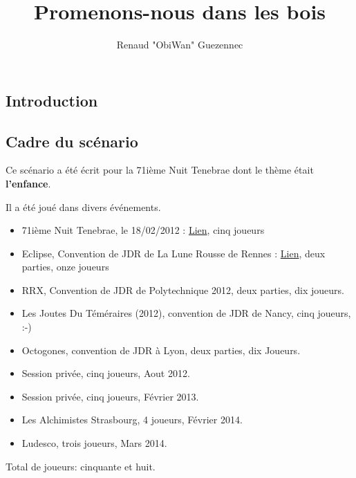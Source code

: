 \documentclass[oneside,12pt]{book}
\title{Promenons-nous dans les bois}
\author{Renaud "ObiWan" Guezennec}
\date{}
\begin{document}
\maketitle \clearpage
\tableofcontents \clearpage
\listoffigures \clearpage

\begin{flushleft}
    \chapter{Introduction}
    \section{Cadre du scénario}
    Ce scénario a été écrit pour la 71ième Nuit Tenebrae dont le thème était \textbf{l'enfance}. 
    
    Il a été joué dans divers événements. 
    \begin{itemize}
    \item 71ième Nuit Tenebrae, le 18/02/2012 : \href{http://www.tenebrae-mundis.com/les-nuits-tenebrae/teaser-de-la-71e-nuit-tenebrae}{Lien}, cinq joueurs
    \item Eclipse, Convention de JDR de La Lune Rousse de Rennes : \href{http://www.ascreb.org/clubs/jdr/convention/archives/eclipse10.php}{Lien}, deux parties, onze joueurs
    \item RRX, Convention de JDR de Polytechnique 2012, deux parties, dix joueurs. 
    \item Les Joutes Du Téméraires (2012), convention de JDR de Nancy, cinq joueurs, :-)
    \item Octogones, convention de JDR à Lyon, deux parties, dix Joueurs.
    \item Session privée, cinq joueurs, Aout 2012.
    \item Session privée, cinq joueurs, Février 2013.
    \item Les Alchimistes Strasbourg, 4 joueurs, Février 2014.
    \item Ludesco, trois joueurs, Mars 2014.
    \end{itemize}
    
    Total de joueurs: cinquante et huit.



\end{flushleft}
\end{document}
